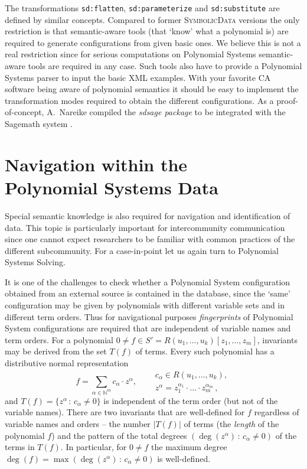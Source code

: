 \documentclass[a4paper,11pt]{article}
\def\Ueberschrift#1#2{\section{#1}}
\def\SD{\textsc{SymbolicData}}
\begin{document}
\begin{multicols}{2}
 The transformations \texttt{sd:flatten}, \texttt{sd:parame\-terize} and
 \texttt{sd:substitute} are defined by similar concepts.  Compared to former {\SD}
 versions the only restriction is that semantic-aware tools (that `know' what
 a polynomial is) are required to generate configurations from given basic
 ones.  We believe this is not a real restriction since for serious
 computations on Polynomial Systems semantic-aware tools are required in any
 case.  Such tools also have to provide a Polynomial Systems parser to input
 the basic XML examples.  With your favorite CA software being aware of
 polynomial semantics it should be easy to implement the transformation modes
 required to obtain the different configurations. As a proof-of-concept,
 A.~Nareike compiled the \emph{sdsage package} \cite{sdsage} to be integrated
 with the Sagemath system \cite{Sagemath}.

\Ueberschrift{Navigation within the\\ Polynomial Systems Data}{navigation}

Special semantic knowledge is also required for navigation and 
identification of data.  This topic is particularly important for 
intercommunity communication since one cannot expect researchers to be 
familiar with common practices of the different subcommunity.
For a case-in-point let us again turn to Polynomial Systems Solving.

It is one of the challenges to check whether a Polynomial System 
configuration obtained from an external source is contained in the 
database, since the `same' configuration may be given by polynomials 
with different variable sets and in different term orders.  Thus for 
navigational purposes \emph{fingerprints} of Polynomial System 
configurations are required that are independent of variable names and 
term orders.  For a polynomial $0\neq f\in 
S'=R(u_1,\dots,u_k)[z_1,\dots,z_m]$, invariants may be derived from the 
set $T(f)$ of terms.  Every such polynomial has a distributive normal 
representation
$$
f = \sum_{\alpha\in\mathbb{N}^m}{c_\alpha\cdot z^\alpha},
\quad\begin{aligned}
& c_\alpha\in R(u_1,\dots,u_k), \\
& z^\alpha = z_1^{\alpha_1}\cdot\ldots\cdot z_m^{\alpha_m}\,,
\end{aligned}
$$
and $T(f)=\{z^\alpha\,:\,c_\alpha\neq 0\}$ is independent of the term 
order (but not of the variable names).  There are two invariants that 
are well-defined for $f$ regardless of variable names and orders -- 
the number $|T(f)|$ of terms (the \emph{length} of the polynomial $f$) 
and the pattern of the total degrees $(\deg(z^\alpha)\,:\,c_\alpha\neq 
0)$ of the terms in $T(f)$.  In particular, for $0\neq f$ the maximum 
degree $\deg(f)=\max(\deg(z^\alpha)\,:\,c_\alpha\neq 0)$ is 
well-defined.


\end{multicols}
\end{document}
